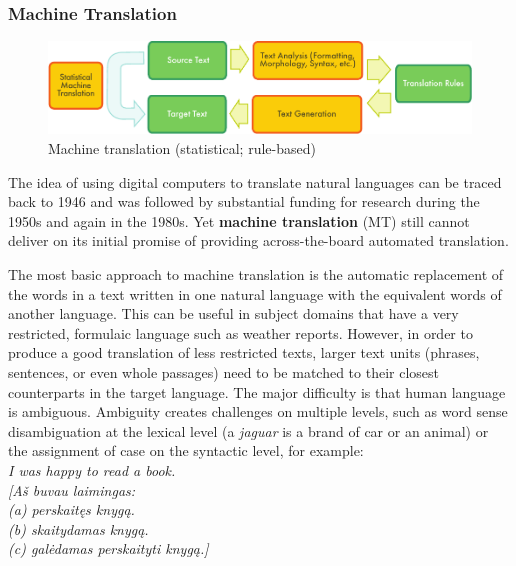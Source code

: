 \begin{multicols}{2}
\subsubsection{Machine Translation}

\begin{figure}[htb]
  \center
  \includegraphics[width=\textwidth]{../_media/english/machine_translation}
  \caption{Machine translation (statistical; rule-based)}
  \label{fig:mtarch_en}
\end{figure}

The idea of using digital computers to translate natural languages can be traced back to 1946 and was followed by substantial funding for research during the 1950s and again in the 1980s. 
Yet \textbf{machine translation} (MT) still cannot deliver on its initial promise of providing across-the-board automated translation.  


The most basic approach to machine translation is the automatic replacement of the words in a text written in one natural language with the equivalent words of another language. This can be useful in subject domains that have a very restricted, formulaic language such as weather reports.
However, in order to produce a good translation of less restricted texts, larger text units (phrases, sentences, or even whole passages) need to be matched to their closest counterparts in the target language. The major difficulty is that human language is ambiguous. Ambiguity creates challenges on multiple levels, such as word sense disambiguation at the lexical level (a \textit{jaguar} is a brand of car or an animal) or the assignment of case on the syntactic level, for example:\\
 \textit{I was happy to read a book.\\
      {[}Aš buvau laimingas:\\
      (a) perskaitęs knygą.\\
      (b) skaitydamas knygą.\\
      (c) galėdamas perskaityti knygą.] }


\end{multicols}
